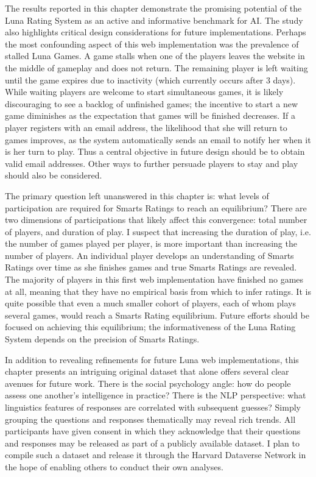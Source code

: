 The results reported in this chapter demonstrate the promising potential of the Luna Rating System as an active and informative benchmark for AI. The study also highlights critical design considerations for future implementations. Perhaps the most confounding aspect of this web implementation was the prevalence of stalled Luna Games. A game stalls when one of the players leaves the website in the middle of gameplay and does not return. The remaining player is left waiting until the game expires due to inactivity (which currently occurs after 3 days). While waiting players are welcome to start simultaneous games, it is likely discouraging to see a backlog of unfinished games; the incentive to start a new game diminishes as the expectation that games will be finished decreases. If a player registers with an email address, the likelihood that she will return to games improves, as the system automatically sends an email to notify her when it is her turn to play. Thus a central objective in future design should be to obtain valid email addresses. Other ways to further persuade players to stay and play should also be considered.

The primary question left unanswered in this chapter is: what levels of participation are required for Smarts Ratings to reach an equilibrium? There are two dimensions of participations that likely affect this convergence: total number of players, and duration of play. I suspect that increasing the duration of play, i.e. the number of games played per player, is more important than increasing the number of players. An individual player develops an understanding of Smarts Ratings over time as she finishes games and true Smarts Ratings are revealed. The majority of players in this first web implementation have finished no games at all, meaning that they have no empirical basis from which to infer ratings. It is quite possible that even a much smaller cohort of players, each of whom plays several games, would reach a Smarts Rating equilibrium. Future efforts should be focused on achieving this equilibrium; the informativeness of the Luna Rating System depends on the precision of Smarts Ratings.

In addition to revealing refinements for future Luna web implementations, this chapter presents an intriguing original dataset that alone offers several clear avenues for future work. There is the social psychology angle: how do people assess one another's intelligence in practice? There is the NLP perspective: what linguistics features of responses are correlated with subsequent guesses? Simply grouping the questions and responses thematically may reveal rich trends. All participants have given consent in which they acknowledge that their questions and responses may be released as part of a publicly available dataset. I plan to compile such a dataset and release it through the Harvard Dataverse Network in the hope of enabling others to conduct their own analyses.
